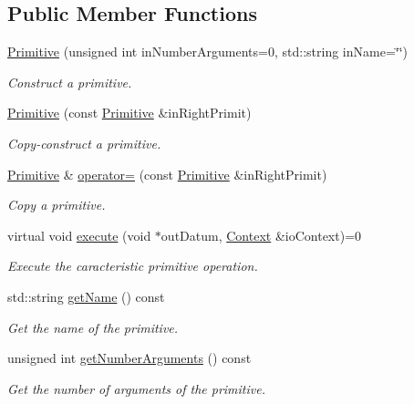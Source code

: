 \subsection*{Public Member Functions}
\begin{DoxyCompactItemize}
\item 
\hyperlink{classPuppy_1_1Primitive_a17fd0027a0723bcb35b98f1b43eebeb6}{Primitive} (unsigned int in\+Number\+Arguments=0, std\+::string in\+Name=\char`\"{}\char`\"{})
\begin{DoxyCompactList}\small\item\em Construct a primitive. \end{DoxyCompactList}\item 
\hyperlink{classPuppy_1_1Primitive_a3b3d62da2d801dd5c1e7d6dd532bf45d}{Primitive} (const \hyperlink{classPuppy_1_1Primitive}{Primitive} \&in\+Right\+Primit)
\begin{DoxyCompactList}\small\item\em Copy-\/construct a primitive. \end{DoxyCompactList}\item 
\hyperlink{classPuppy_1_1Primitive}{Primitive} \& \hyperlink{classPuppy_1_1Primitive_a6b93a819ffca6451f44babace6df562a}{operator=} (const \hyperlink{classPuppy_1_1Primitive}{Primitive} \&in\+Right\+Primit)
\begin{DoxyCompactList}\small\item\em Copy a primitive. \end{DoxyCompactList}\item 
virtual void \hyperlink{classPuppy_1_1Primitive_aaef85034e66f49903c591158c3b5ffef}{execute} (void $\ast$out\+Datum, \hyperlink{classPuppy_1_1Context}{Context} \&io\+Context)=0
\begin{DoxyCompactList}\small\item\em Execute the caracteristic primitive operation. \end{DoxyCompactList}\item 
std\+::string \hyperlink{classPuppy_1_1Primitive_a54739a2bb20095ba3a870d5a0f40ce97}{get\+Name} () const 
\begin{DoxyCompactList}\small\item\em Get the name of the primitive. \end{DoxyCompactList}\item 
unsigned int \hyperlink{classPuppy_1_1Primitive_abddcfecae834ed4ad1e4ef0f21c4a3ff}{get\+Number\+Arguments} () const 
\begin{DoxyCompactList}\small\item\em Get the number of arguments of the primitive. \end{DoxyCompactList}\item 

\end{DoxyCompactItemize}
